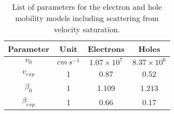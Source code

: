 \begin{table}[!h]
\centering
\begin{tabular}{cccc}
\toprule
Parameter & Unit & Electrons & Holes \\
\midrule
$v_0$ & $cm\,s^{-1}$ & $1.07\times 10^{7}$ & $8.37\times 10^{6}$\\
$v_{exp}$ & 1 & 0.87 & 0.52\\
$\beta_0$ & 1 & 1.109 & 1.213 \\
$\beta_{exp}$ & 1 & 0.66 & 0.17\\
\bottomrule
\end{tabular}
\caption{List of parameters for the electron and hole mobility models including scattering from velocity saturation.}
\end{table}

